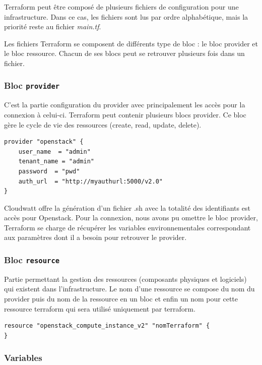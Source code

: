 \documentclass[]{article}
\begin{document}
Terraform peut être composé de plusieurs fichiers de configuration pour
une infrastructure. Dans ce cas, les fichiers sont lus par ordre
alphabétique, mais la priorité reste au fichier \emph{main.tf}.

Les fichiers Terraform se composent de différents type de bloc : le bloc
provider et le bloc ressource. Chacun de ses blocs peut se retrouver
plusieurs fois dans un fichier.

\subsubsection{\texorpdfstring{Bloc
\textbf{\texttt{provider}}}{Bloc provider}}\label{bloc-provider}

C'est la partie configuration du provider avec principalement les accès
pour la connexion à celui-ci. Terraform peut contenir plusieurs blocs
provider. Ce bloc gère le cycle de vie des ressources (create, read,
update, delete).
\begin{verbatim}
provider "openstack" {
    user_name  = "admin"
    tenant_name = "admin"
    password  = "pwd"
    auth_url  = "http://myauthurl:5000/v2.0"
}
\end{verbatim}
Cloudwatt offre la génération d'un fichier .sh avec la totalité des
identifiants est accès pour Openstack. Pour la connexion, nous avons pu
omettre le bloc provider, Terraform se charge de récupérer les variables
environnementales correspondant aux paramètres dont il a besoin pour
retrouver le provider.

\subsubsection{\texorpdfstring{Bloc
\textbf{\texttt{resource}}}{Bloc resource}}\label{bloc-resource}

Partie permettant la gestion des ressources (composants physiques et
logiciels) qui existent dans l'infrastructure. Le nom d'une ressource se
compose du nom du provider puis du nom de la ressource en un bloc et
enfin un nom pour cette ressource terraform qui sera utilisé uniquement
par terraform.
\begin{verbatim}
resource "openstack_compute_instance_v2" "nomTerraform" {
}
\end{verbatim}

\subsubsection{Variables}\label{variables}
\end{document}
